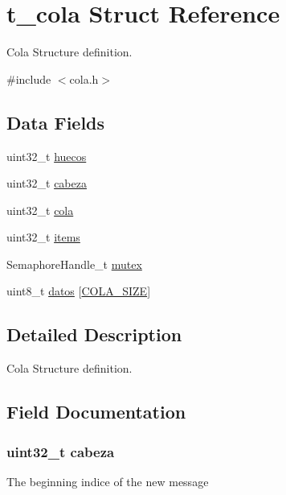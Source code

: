 \hypertarget{structt__cola}{}\section{t\+\_\+cola Struct Reference}
\label{structt__cola}


Cola Structure definition.  




{\ttfamily \#include $<$cola.\+h$>$}

\subsection*{Data Fields}
\begin{DoxyCompactItemize}
\item 
uint32\+\_\+t \hyperlink{structt__cola_a326c5b8fc3633ed405339faf05e5a552}{huecos}
\item 
uint32\+\_\+t \hyperlink{structt__cola_aa60b2d7a3752db97b7f9d9163fb48afa}{cabeza}
\item 
uint32\+\_\+t \hyperlink{structt__cola_ae6eec6efa2dd9d70da13b2a435c3de27}{cola}
\item 
uint32\+\_\+t \hyperlink{structt__cola_a3691abaa51fe86a073eaabdd1c39b74c}{items}
\item 
Semaphore\+Handle\+\_\+t \hyperlink{structt__cola_afc659d089f5608a17e8650e59a7e26fc}{mutex}
\item 
uint8\+\_\+t \hyperlink{structt__cola_a8eaaf6d0a3ebef35b2d6c94e9a63bf3d}{datos} \mbox{[}\hyperlink{group___cola___private___define_gad5b7f14b39751409f4090d7c2d45f915}{C\+O\+L\+A\+\_\+\+S\+I\+ZE}\mbox{]}
\end{DoxyCompactItemize}


\subsection{Detailed Description}
Cola Structure definition. 

\subsection{Field Documentation}
\subsubsection[{\texorpdfstring{cabeza}{cabeza}}]{\setlength{\rightskip}{0pt plus 5cm}uint32\+\_\+t cabeza}\hypertarget{structt__cola_aa60b2d7a3752db97b7f9d9163fb48afa}{}\label{structt__cola_aa60b2d7a3752db97b7f9d9163fb48afa}
The beginning indice of the new message 
